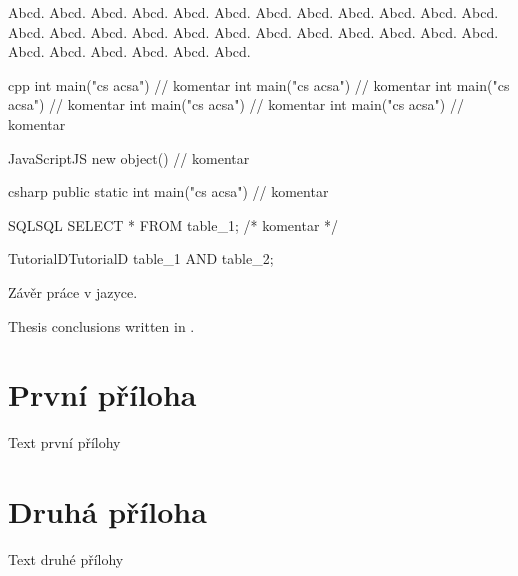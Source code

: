 \documentclass[
  master=false,               %
  font=sans,                  %
  printversion=false,         %
  joinlists=true,             %
  glossaries=true,            %
  figures=true,               %
  tables=true,                %
  sourcecodes=true,					  %
  theorems=true,						  %
  bibencoding=utf8,           %
  language=czech,             %
  encoding=utf8,              %
  field=inf,                  %
  index=true,                 %
]{updiplom}
\begin{document}
\begin{theorem}
Abcd. Abcd. Abcd. Abcd. Abcd. Abcd. Abcd. Abcd. Abcd. Abcd. Abcd. Abcd. Abcd. Abcd. Abcd. Abcd. Abcd. Abcd. Abcd. Abcd. Abcd. Abcd. Abcd. Abcd. Abcd. Abcd. Abcd. Abcd. Abcd. Abcd. 
\end{theorem}


\begin{upcode}{cpp}{}{\cpp}
int main("cs acsa") // komentar
int main("cs acsa") // komentar
int main("cs acsa") // komentar
int main("cs acsa") // komentar
int main("cs acsa") // komentar
\end{upcode}

\begin{upcode}{JavaScript}{}{JS}
new object() // komentar
\end{upcode}

\begin{upcode}{csharp}{}{\csharp}
public static int main("cs acsa") // komentar
\end{upcode}

\begin{upcode}{SQL}{}{SQL}
SELECT * FROM table_1; /* komentar */
\end{upcode}

\begin{upcode}{TutorialD}{}{TutorialD}
table_1 AND table_2;
\end{upcode}

\begin{upconclusions}
Závěr práce v  jazyce.
\end{upconclusions}

\begin{upconclusions}[english]
Thesis conclusions written in .
\end{upconclusions}

\appendix
\section{První příloha}
Text první přílohy

\section{Druhá příloha}
Text druhé přílohy

\printglossary

\nocite{*}							%
\printbibliography

%

\printindex
\end{document}
